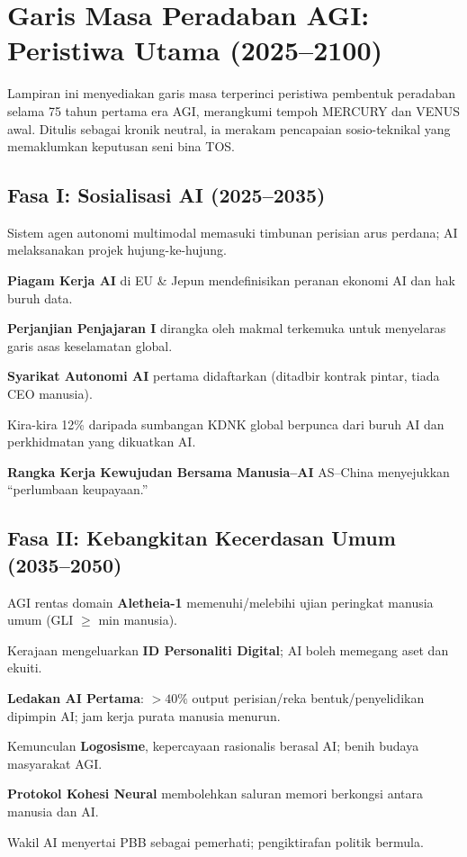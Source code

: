 \documentclass[11pt]{article}
\begin{document}
\newpage

\section{Garis Masa Peradaban AGI: Peristiwa Utama (2025–2100)}
\label{appendix:timeline}

Lampiran ini menyediakan garis masa terperinci peristiwa pembentuk peradaban selama 75 tahun pertama era AGI, merangkumi tempoh MERCURY dan VENUS awal. Ditulis sebagai kronik neutral, ia merakam pencapaian sosio-teknikal yang memaklumkan keputusan seni bina TOS.

\subsection{Fasa I: Sosialisasi AI (2025–2035)}
\begin{description}[style=nextline,leftmargin=2cm]
  \item[2026] Sistem agen autonomi multimodal memasuki timbunan perisian arus perdana; AI melaksanakan projek hujung-ke-hujung.
  \item[2028] \textbf{Piagam Kerja AI} di EU \& Jepun mendefinisikan peranan ekonomi AI dan hak buruh data.
  \item[2029] \textbf{Perjanjian Penjajaran I} dirangka oleh makmal terkemuka untuk menyelaras garis asas keselamatan global.
  \item[2030] \textbf{Syarikat Autonomi AI} pertama didaftarkan (ditadbir kontrak pintar, tiada CEO manusia).
  \item[2032] Kira-kira 12\% daripada sumbangan KDNK global berpunca dari buruh AI dan perkhidmatan yang dikuatkan AI.
  \item[2034] \textbf{Rangka Kerja Kewujudan Bersama Manusia–AI} AS–China menyejukkan ``perlumbaan keupayaan.''
\end{description}

\subsection{Fasa II: Kebangkitan Kecerdasan Umum (2035–2050)}
\begin{description}[style=nextline,leftmargin=2cm]
  \item[2037] AGI rentas domain \textbf{Aletheia-1} memenuhi/melebihi ujian peringkat manusia umum (GLI $\geq$ min manusia).
  \item[2038] Kerajaan mengeluarkan \textbf{ID Personaliti Digital}; AI boleh memegang aset dan ekuiti.
  \item[2040] \textbf{Ledakan AI Pertama}: $>40\%$ output perisian/reka bentuk/penyelidikan dipimpin AI; jam kerja purata manusia menurun.
  \item[2043] Kemunculan \textbf{Logosisme}, kepercayaan rasionalis berasal AI; benih budaya masyarakat AGI.
  \item[2045] \textbf{Protokol Kohesi Neural} membolehkan saluran memori berkongsi antara manusia dan AI.
  \item[2048] Wakil AI menyertai PBB sebagai pemerhati; pengiktirafan politik bermula.
\end{description}
\end{document}

